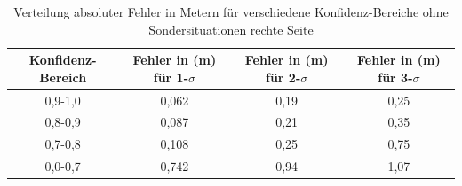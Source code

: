 \begin{table}[h]
    \centering
    \begin{tabular}{|c|c|c|c|}
    \hline                      %
    Konfidenz-Bereich & Fehler in (m) für 1-$\sigma$  & Fehler in (m) für 2-$\sigma$    & Fehler in (m) für 3-$\sigma$    \\
    \hline
    0,9-1,0           & 0,062                     & 0,19                          & 0,25                         \\
    0,8-0,9           & 0,087                     & 0,21                          & 0,35                         \\
    0,7-0,8           & 0,108                     & 0,25                          & 0,75                          \\
    0,0-0,7           & 0,742                     & 0,94                          & 1,07                           \\
    
    \hline
    \end{tabular}
    \caption{Verteilung absoluter Fehler in Metern für verschiedene Konfidenz-Bereiche ohne Sondersituationen rechte Seite} %
    \label{tab:errors_conf_right}
\end{table}